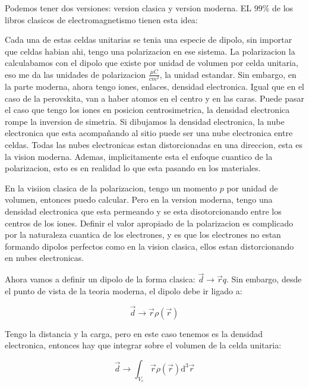 \documentclass[11pt,fleqn]{book}
\begin{document}
Podemos tener dos versiones: version clasica y version moderna. EL $99\%$ de los libros clasicos de electromagnetismo tienen esta idea:


Cada una de estas celdas unitarias se tenia una especie de dipolo, sin importar que celdas habian ahi, tengo una polarizacion en ese sistema. La polarizacion la calculabamos con el dipolo que existe por unidad de volumen por celda unitaria, eso me da las unidades de polarizacion $\frac{\mu C}{cm^{2}}$, la unidad estandar. Sin embargo, en la parte moderna, ahora tengo iones, enlaces, densidad electronica. Igual que en el caso de la perovskita, van a haber atomos en el centro y en las caras. Puede pasar el caso que tengo los iones en posicion centrosimetrica, la densidad electronica rompe la inversion de simetria.  Si dibujamos la densidad electronica, la nube electronica que esta acompañando al sitio puede ser una nube electronica entre celdas. Todas las nubes electronicas estan distorcionadas en una direccion, esta es la vision moderna. Ademas, implicitamente esta el enfoque cuantico de la polarizacion, esto es en realidad lo que esta pasando en los materiales.

En la visiion clasica de la polarizacion, tengo un momento $p$ por unidad de volumen, entonces puedo calcular. Pero en la version moderna, tengo una densidad electronica que esta permeando y se esta disotorcionando entre los centros de los iones. Definir el valor apropiado de la polarizacion es complicado por la naturaleza cuantica de los electrones, y es que los electrones no estan formando dipolos perfectos como en la vision clasica, ellos estan distorcionando en nubes electronicas.

Ahora vamos a definir un dipolo de la forma clasica: $\vec{d}\rightarrow \vec{r}q$. Sin embargo, desde el punto de vista de la teoria moderna, el dipolo debe ir ligado a:

\begin{equation}
    \vec{d}\rightarrow\vec{r}\rho(\vec{r})
\end{equation}

Tengo la distancia y la carga, pero en este caso tenemos es la densidad electronica, entonces hay que integrar sobre el volumen de la celda unitaria:

\begin{equation}
    \vec{d}\rightarrow\int_{V_{c}}\vec{r}\rho(\vec{r})\mathrm{d}^{3}\vec{r}
\end{equation}
\end{document}
